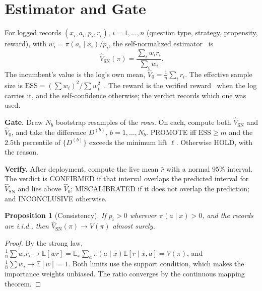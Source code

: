 \documentclass[conference]{IEEEtran}
\newtheorem{proposition}{Proposition}
\newcommand{\E}{\mathbb{E}}
\begin{document}
\section{Estimator and Gate}
For logged records $(x_i,a_i,p_i,r_i)$, $i=1,\dots,n$ (question type, strategy, propensity, reward), with $w_i=\pi(a_i\mid x_i)/p_i$, the self-normalized estimator~\cite{swaminathan2015} is
\begin{equation}
\hat V_{\mathrm{SN}}(\pi)=\frac{\sum_iw_ir_i}{\sum_iw_i}.
\end{equation}
The incumbent's value is the log's own mean, $\hat V_0=\frac1n\sum_ir_i$. The effective sample size is $\mathrm{ESS}=(\sum w_i)^2/\sum w_i^2$~\cite{kish1965}. The reward is the verified reward~\cite{comp-verified} when the log carries it, and the self-confidence otherwise; the verdict records which one was used.

\textbf{Gate.} Draw $N_b$ bootstrap resamples of the \emph{rows}. On each, compute both $\hat V_{\mathrm{SN}}$ and $\hat V_0$, and take the difference $D^{(b)}$, $b=1,\dots,N_b$. PROMOTE iff $\mathrm{ESS}\ge m$ and the $2.5$th percentile of $\{D^{(b)}\}$ exceeds the minimum lift $\ell$. Otherwise HOLD, with the reason.

\textbf{Verify.} After deployment, compute the live mean $\bar r$ with a normal 95\% interval. The verdict is CONFIRMED if that interval overlaps the predicted interval for $\hat V_{\mathrm{SN}}$ and lies above $\hat V_0$; MISCALIBRATED if it does not overlap the prediction; and INCONCLUSIVE otherwise.

\begin{proposition}[Consistency]\label{prop:consistent}
If $p_i>0$ wherever $\pi(a\mid x)>0$, and the records are i.i.d., then $\hat V_{\mathrm{SN}}(\pi)\to V(\pi)$ almost surely.
\end{proposition}
\begin{proof}
By the strong law, $\frac1n\sum w_ir_i\to\E[wr]=\E_{x}\sum_a\pi(a\mid x)\E[r\mid x,a]=V(\pi)$, and $\frac1n\sum w_i\to\E[w]=1$. Both limits use the support condition, which makes the importance weights unbiased. The ratio converges by the continuous mapping theorem.
\end{proof}
\end{document}
